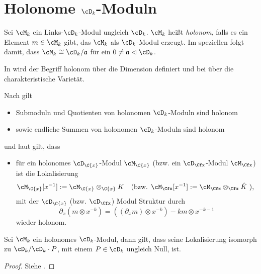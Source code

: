\section{Holonome $\cD_k$-Moduln}
\begin{defn}
Sei $\cM_k$ ein Links-$\cD_k$-Modul ungleich $\cD_k$. $\cM_k$ heißt
\emph{holonom}, falls es ein Element $m\in\cM_k$ gibt, das $\cM_k$ als
$\cD_k$-Modul erzeugt. Im speziellen folgt damit, dass $\cM_k\cong
\cD_k/\mathfrak{a}$ für ein $0\neq\mathfrak{a}\vartriangleleft\cD_k$.
\end{defn}
\begin{bem}
\begin{comment}
Dies hier ist eine sehr vereinfachte, aber für unsere Zwecke völlig
ausreichende, Definition von holonom.
\end{comment}
In \cite{coutinho1995primer} wird der Begriff holonom über die Dimension
definiert und bei \cite{sabbah_cimpa90} über die charakteristische Varietät.
\end{bem}

\begin{bem} 
Nach \cite[Prop 10.1.1]{coutinho1995primer} gilt
\begin{itemize}
\item Submoduln und Quotienten von holonomen $\cD_k$-Moduln sind holonom
\item sowie endliche Summen von holonomen $\cD_k$-Moduln sind holonom
\end{itemize}
und laut \cite[Thm. 4.2.3]{sabbah_cimpa90} gilt, dass
\begin{itemize}
\item für ein holonomes $\cD_{\C\{x\}}$-Modul $\cM_{\C\{x\}}$
(bzw. ein $\cD_{\Cfx}$-Modul $\cM_{\Cfx}$)
ist die Lokalisierung
\begin{align*}
\cM_{\C\{x\}}[x^{-1}]&:=\cM_{\C\{x\}}\otimes_{\C\{x\}}K
&&\text{(bzw. }\cM_{\Cfx}[x^{-1}]:=\cM_{\Cfx}\otimes_{\Cfx}\hat K\text{ ),}
\end{align*}
mit der $\cD_{\C\{x\}}$ (bzw. $\cD_{\Cfx}$) Modul Struktur durch
\[
\partial_x(m\otimes x^{-k})=((\partial_xm)\otimes x^{-k})-km\otimes x^{-k-1}
\]
wieder holonom.
\end{itemize}
\end{bem}

\begin{thm}
Sei $\cM_k$ ein holonomes $\cD_k$-Modul, dann gilt, dass seine Lokalisierung
isomorph zu $\cD_k/\cD_k\cdot P$, mit einem $P\in \cD_k$ ungleich Null, ist.
\end{thm}
\begin{proof}
Siehe \cite[Cor 4.2.8]{sabbah_cimpa90}.
\end{proof}

